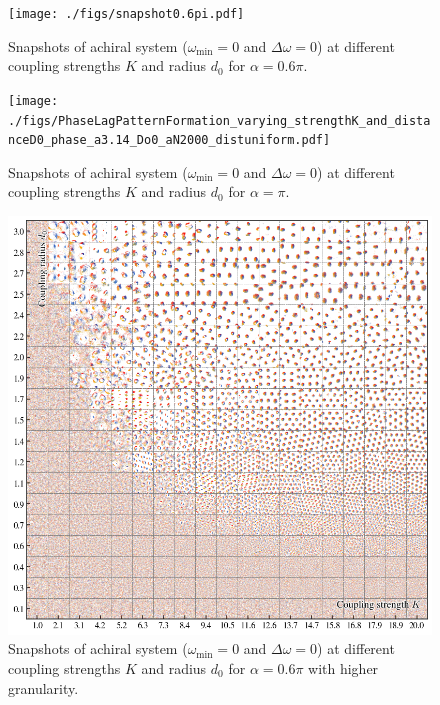 \documentclass{article}
\begin{document}
\begin{figure}[H]
    \centering
    \texttt{[image: ./figs/snapshot0.6pi.pdf]}
    \caption{
        Snapshots of achiral system ($\omega _{\min}=0$ and $\Delta \omega=0$) at different coupling strengths $K$ and radius $d_0$ for $\alpha = 0.6\pi$. 
    }
\end{figure}

\begin{figure}[H]
    \centering
    \texttt{[image: ./figs/PhaseLagPatternFormation\_varying\_strengthK\_and\_distanceD0\_phase\_a3.14\_Do0\_aN2000\_distuniform.pdf]}
    \caption{
        Snapshots of achiral system ($\omega _{\min}=0$ and $\Delta \omega=0$) at different coupling strengths $K$ and radius $d_0$ for $\alpha = \pi$. 
    }
\end{figure}

\begin{figure}[H]
    \centering
    \includegraphics[width=\textwidth]{./figs/PhaseLagPatternFormation_varying_strengthK_and_distanceD0_phase_a1.88_Do0_aN2000_distuniform.png}
    \caption{
        \label{fig:snapshot0.6pi_chiral}
        Snapshots of achiral system ($\omega _{\min}=0$ and $\Delta \omega=0$) at different coupling strengths $K$ and radius $d_0$ for $\alpha = 0.6\pi$ with higher granularity. 
    }
\end{figure}
\end{document}
